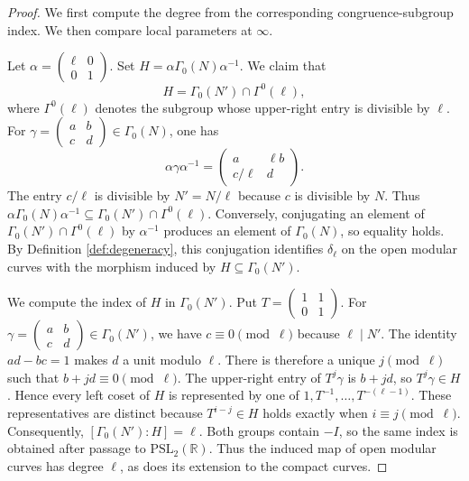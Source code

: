 \documentclass[12pt, letterpaper]{amsart}
\theoremstyle{definition}
\theoremstyle{remark}
\numberwithin{equation}{section}
\begin{document}
\begin{proof}
We first compute the degree from the corresponding congruence-subgroup index.
We then compare local parameters at \(\infty\).

Let \(\alpha=\left(\begin{smallmatrix}\ell&0\\0&1\end{smallmatrix}\right)\).
Set \(H=\alpha\Gamma_0(N)\alpha^{-1}\). We claim that
\[
        H=\Gamma_0(N')\cap\Gamma^0(\ell),
\]
where \(\Gamma^0(\ell)\) denotes the subgroup whose upper-right entry is
divisible by \(\ell\). For
\(\gamma=\left(\begin{smallmatrix}a&b\\c&d\end{smallmatrix}\right)\in
\Gamma_0(N)\), one has
\[
 \alpha\gamma\alpha^{-1}
 =\begin{pmatrix}a&\ell b\\c/\ell&d\end{pmatrix}.
\]
The entry \(c/\ell\) is divisible by \(N'=N/\ell\) because \(c\) is divisible
by \(N\).
Thus
\(\alpha\Gamma_0(N)\alpha^{-1}\subseteq\Gamma_0(N')\cap\Gamma^0(\ell)\).
Conversely, conjugating an element of
\(\Gamma_0(N')\cap\Gamma^0(\ell)\) by \(\alpha^{-1}\) produces an element of
\(\Gamma_0(N)\), so equality holds. By Definition \ref{def:degeneracy}, this
conjugation identifies \(\delta_\ell\) on the open modular curves with the
morphism induced by \(H\subseteq\Gamma_0(N')\).

We compute the index of \(H\) in \(\Gamma_0(N')\). Put
\(T=\left(\begin{smallmatrix}1&1\\0&1\end{smallmatrix}\right)\). For
\(\gamma=\left(\begin{smallmatrix}a&b\\c&d\end{smallmatrix}\right)\in\Gamma_0(N')\),
we have \(c\equiv0\pmod\ell\) because \(\ell\mid N'\). The identity
\(ad-bc=1\) makes \(d\) a unit modulo \(\ell\). There is therefore
a unique \(j\pmod\ell\) such that \(b+jd\equiv0\pmod\ell\). The upper-right
entry of \(T^j\gamma\) is \(b+jd\), so \(T^j\gamma\in H\). Hence every left
coset of \(H\) is represented by one of \(1,T^{-1},\dots,T^{-(\ell-1)}\).
These representatives are distinct because
\(T^{i-j}\in H\) holds exactly when
\(i\equiv j\pmod\ell\). Consequently, \([\Gamma_0(N'):H]=\ell\). Both groups
contain \(-I\), so the same index is obtained after passage to
\(\mathrm{PSL}_2(\mathbb R)\). Thus the induced map of open modular curves has
degree \(\ell\), as does its extension to the compact curves.


\end{proof}
\end{document}
